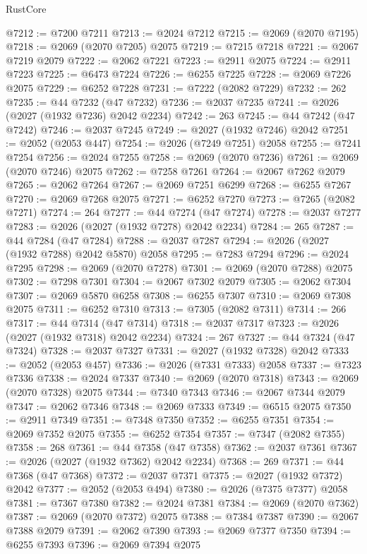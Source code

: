 \begin{lexlean}{RustCore}
\begin{coremodule}
@7212 := @7200 @7211
@7213 := @2024 @7212
@7215 := @2069 (@2070 @7195)
@7218 := @2069 (@2070 @7205) @2075
@7219 := @7215 @7218
@7221 := @2067 @7219 @2079
@7222 := @2062 @7221
@7223 := @2911 @2075
@7224 := @2911 @7223
@7225 := @6473 @7224
@7226 := @6255 @7225
@7228 := @2069 @7226 @2075
@7229 := @6252 @7228
@7231 := @7222 (@2082 @7229)
@7232 := 262
@7235 := @44 @7232 (@47 @7232)
@7236 := @2037 @7235
@7241 := @2026 (@2027 (@1932 @7236) @2042 @2234)
@7242 := 263
@7245 := @44 @7242 (@47 @7242)
@7246 := @2037 @7245
@7249 := @2027 (@1932 @7246) @2042
@7251 := @2052 (@2053 @447)
@7254 := @2026 (@7249 @7251) @2058
@7255 := @7241 @7254
@7256 := @2024 @7255
@7258 := @2069 (@2070 @7236)
@7261 := @2069 (@2070 @7246) @2075
@7262 := @7258 @7261
@7264 := @2067 @7262 @2079
@7265 := @2062 @7264
@7267 := @2069 @7251 @6299
@7268 := @6255 @7267
@7270 := @2069 @7268 @2075
@7271 := @6252 @7270
@7273 := @7265 (@2082 @7271)
@7274 := 264
@7277 := @44 @7274 (@47 @7274)
@7278 := @2037 @7277
@7283 := @2026 (@2027 (@1932 @7278) @2042 @2234)
@7284 := 265
@7287 := @44 @7284 (@47 @7284)
@7288 := @2037 @7287
@7294 := @2026 (@2027 (@1932 @7288) @2042 @5870) @2058
@7295 := @7283 @7294
@7296 := @2024 @7295
@7298 := @2069 (@2070 @7278)
@7301 := @2069 (@2070 @7288) @2075
@7302 := @7298 @7301
@7304 := @2067 @7302 @2079
@7305 := @2062 @7304
@7307 := @2069 @5870 @6258
@7308 := @6255 @7307
@7310 := @2069 @7308 @2075
@7311 := @6252 @7310
@7313 := @7305 (@2082 @7311)
@7314 := 266
@7317 := @44 @7314 (@47 @7314)
@7318 := @2037 @7317
@7323 := @2026 (@2027 (@1932 @7318) @2042 @2234)
@7324 := 267
@7327 := @44 @7324 (@47 @7324)
@7328 := @2037 @7327
@7331 := @2027 (@1932 @7328) @2042
@7333 := @2052 (@2053 @457)
@7336 := @2026 (@7331 @7333) @2058
@7337 := @7323 @7336
@7338 := @2024 @7337
@7340 := @2069 (@2070 @7318)
@7343 := @2069 (@2070 @7328) @2075
@7344 := @7340 @7343
@7346 := @2067 @7344 @2079
@7347 := @2062 @7346
@7348 := @2069 @7333
@7349 := @6515 @2075
@7350 := @2911 @7349
@7351 := @7348 @7350
@7352 := @6255 @7351
@7354 := @2069 @7352 @2075
@7355 := @6252 @7354
@7357 := @7347 (@2082 @7355)
@7358 := 268
@7361 := @44 @7358 (@47 @7358)
@7362 := @2037 @7361
@7367 := @2026 (@2027 (@1932 @7362) @2042 @2234)
@7368 := 269
@7371 := @44 @7368 (@47 @7368)
@7372 := @2037 @7371
@7375 := @2027 (@1932 @7372) @2042
@7377 := @2052 (@2053 @494)
@7380 := @2026 (@7375 @7377) @2058
@7381 := @7367 @7380
@7382 := @2024 @7381
@7384 := @2069 (@2070 @7362)
@7387 := @2069 (@2070 @7372) @2075
@7388 := @7384 @7387
@7390 := @2067 @7388 @2079
@7391 := @2062 @7390
@7393 := @2069 @7377 @7350
@7394 := @6255 @7393
@7396 := @2069 @7394 @2075

\end{coremodule}
\end{lexlean}
